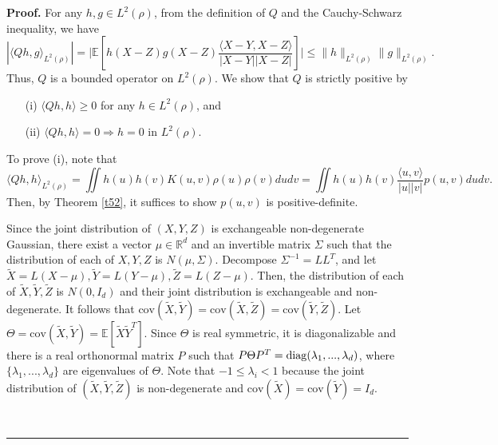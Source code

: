 \documentclass[]{elsarticle}
\def\R{\mathbb{R}}
\def\E{\mathbb{E}}
\newcommand{\cov}{\mathrm{cov}}
\newcommand{\innerp}[2]{\langle #1,#2 \rangle}
\newenvironment{proof}[1][Proof]{\noindent\textbf{#1.} }{\ \rule{0.5em}{0.5em}}
\numberwithin{equation}{section}
\numberwithin{theorem}{section}
\begin{document}
\begin{proof} For any $h,g\in L^2(\rho)$, from the definition of $Q$ and the Cauchy-Schwarz inequality, we have
\[|\innerp{Qh}{g}_ {L^2(\rho)}|=\Big|\E[h(X-Z)g(X-Z)\frac{\innerp{X-Y}{X-Z}}{|X-Y||X-Z|}]\Big|\le \|h\|_{L^2(\rho)}\|g\|_{L^2(\rho)}.\]
Thus, $Q$ is  a bounded operator on $L^2(\rho)$. We show that $Q$ is strictly positive by 
\begin{itemize}
\item [(i)] $\innerp{Qh}{h}\ge0$ for any $h\in L^2(\rho)$, and 
\item [(ii)] $\innerp{Qh}{h}=0\Rightarrow h=0$ in $L^2(\rho)$.
\end{itemize}

To prove (i),  note that
\begin{equation}\label{Qhh}
  \innerp{Qh}{h}_ {L^2(\rho)}= \iint h(u)h(v) K(u,v) \rho(u)\rho(v) dudv= \iint h(u)h(v)\frac{\innerp{u}{v}}{|u||v|}p(u,v)dudv. 
\end{equation}
 Then, by Theorem \ref{t52}, it suffices to show $p(u,v)$ is positive-definite.
 
Since the joint distribution of $(X,Y,Z)$ is exchangeable non-degenerate Gaussian, there exist a vector $\mu \in \R^d$ and an invertible matrix $\Sigma$ such that the distribution of each of $X,Y,Z$ is $N(\mu, \Sigma)$. Decompose $\Sigma^{-1}=LL^T$, and let $\tilde X = L(X-\mu), \tilde Y = L(Y-\mu), \tilde Z = L(Z-\mu) $. Then, the distribution of each of $\tilde X,\tilde Y,\tilde Z$ is $N(0,I_d)$ and their joint distribution is exchangeable and non-degenerate. It follows that $ \cov(\tilde X,\tilde Y)=\cov(\tilde X,\tilde Z)=\cov(\tilde Y,\tilde Z)$.  Let $\Theta=\cov(\tilde X,\tilde Y) =\E[\tilde X\tilde Y^T]$. Since $\Theta$ is real symmetric, it is diagonalizable and there is a real orthonormal matrix $P$ such that $P\Theta P^T={\rm diag}(\lambda_1,...,\lambda_d)$, where $\{\lambda_1,...,\lambda_d\}$ are eigenvalues of $\Theta$. Note that $-1\le\lambda_i<1$ because the joint distribution of $(\tilde X,\tilde Y,\tilde Z)$ is non-degenerate and $\cov(\tilde X) =\cov(\tilde Y) =I_d$. 
 

\end{proof}
\end{document}
